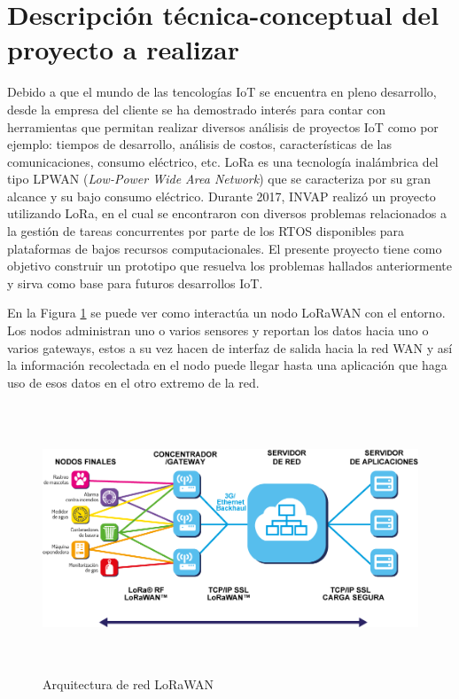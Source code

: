\documentclass[11pt]{charter}
\begin{document}
\section{Descripción técnica-conceptual del proyecto a realizar}
\label{sec:descripcion}

Debido a que el mundo de las tencologías IoT se encuentra en pleno desarrollo, desde la empresa del cliente se ha demostrado interés para contar con herramientas que permitan realizar diversos análisis de proyectos IoT como por ejemplo: tiempos de desarrollo, análisis de costos, características de las comunicaciones, consumo eléctrico, etc.
LoRa es una tecnología inalámbrica del tipo LPWAN (\textit{Low-Power Wide Area Network}) que se caracteriza por su gran alcance y su bajo consumo eléctrico. Durante 2017, INVAP realizó un proyecto utilizando LoRa, en el cual se encontraron con diversos problemas relacionados a la gestión de tareas concurrentes por parte de los RTOS disponibles para plataformas de bajos recursos computacionales. 
El presente proyecto tiene como objetivo construir un prototipo que resuelva los problemas hallados anteriormente y sirva como base para futuros desarrollos IoT.

En la Figura \ref{fig:arqLorawan} se puede ver como interactúa un nodo LoRaWAN con el entorno. Los nodos administran uno o varios sensores y reportan los datos hacia uno o varios gateways, estos a su vez hacen de interfaz de salida hacia la red WAN y así la información recolectada en el nodo puede llegar hasta una aplicación que haga uso de esos datos en el otro extremo de la red.

\vspace{25px}

\begin{figure}[htpb]
\centering 
\includegraphics[width=16cm, height=8cm]{./Figuras/nodoLoraWan.png}
\caption{Arquitectura de red LoRaWAN}
\label{fig:arqLorawan}
\end{figure}
\end{document}
